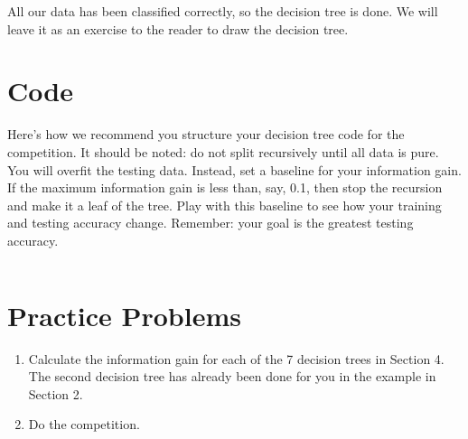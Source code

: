 \documentclass{article}
\begin{document}
All our data has been classified correctly, so the decision tree is done.
We will leave it as an exercise to the reader to draw the decision tree.

\section{Code}
Here's how we recommend you structure your decision tree code for the competition. It should be noted: do not split recursively until all data is pure. You will overfit the testing data. Instead, set a baseline for your information gain. If the maximum information gain is less than, say, 0.1, then stop the recursion and make it a leaf of the tree. Play with this baseline to see how your training and testing accuracy change. Remember: your goal is the greatest testing accuracy.

\inputminted{python}{smallshell.py}


\section{Practice Problems}
\begin{enumerate}
    \item Calculate the information gain for each of the 7 decision trees in Section 4. The second decision tree has already been done for you in the example in Section 2.
    \item Do the competition.
\end{enumerate}
\end{document}
